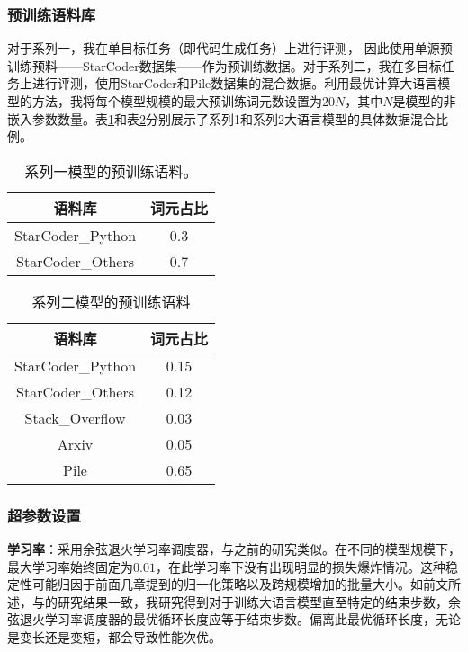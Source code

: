 \subsubsection{预训练语料库}
对于系列一，我在单目标任务（即代码生成任务）上进行评测， 因此使用单源预训练预料——StarCoder数据集\citep{li2023starcoder}——作为预训练数据。对于系列二，我在多目标任务上进行评测，使用StarCoder和Pile数据集\citep{gao2020pile}的混合数据。利用最优计算大语言模型的方法\citep{hoffmann2022training}，我将每个模型规模的最大预训练词元数设置为\(20N\)，其中\(N\)是模型的非嵌入参数数量。表\ref{tab:series1_data_mixture}和表\ref{tab:series2_data_mixture}分别展示了系列1和系列2大语言模型的具体数据混合比例。


\begin{table}
        \centering
        \caption{系列一模型的预训练语料。}
        \begin{tabular}{c|c}
        \toprule
           语料库   &  词元占比 \\
        \midrule
        StarCoder\_Python &  0.3\\
        StarCoder\_Others &  0.7\\
    \bottomrule
        \end{tabular}
        \label{tab:series1_data_mixture}
    \centering
\end{table}

\begin{table}
    \centering
    \caption{系列二模型的预训练语料}
    \begin{tabular}{c|c}
    \toprule
       语料库   &  词元占比 \\
    \midrule
    StarCoder\_Python &  0.15\\
    StarCoder\_Others &  0.12\\
    Stack\_Overflow & 0.03 \\
    Arxiv & 0.05 \\
    Pile & 0.65 \\
\bottomrule
    \end{tabular}
    \label{tab:series2_data_mixture}
\end{table}


\subsubsection{超参数设置}
\label{app:hyperparameters}
\textbf{学习率}：采用余弦退火学习率调度器，与之前的研究\citep{touvron2023llama, touvron2023llama2, hoffmann2022training}类似。在不同的模型规模下，最大学习率始终固定为\(0.01\)，在此学习率下没有出现明显的损失爆炸情况。这种稳定性可能归因于前面几章提到的归一化策略\citep{yang2022tensor}以及跨规模增加的批量大小。如前文所述，与\citet{hoffmann2022training}的研究结果一致，我研究得到对于训练大语言模型直至特定的结束步数，余弦退火学习率调度器的最优循环长度应等于结束步数。偏离此最优循环长度，无论是变长还是变短，都会导致性能次优。

